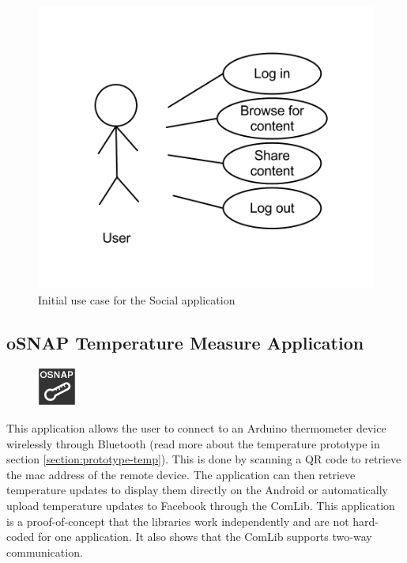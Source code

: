 \begin{figure}[H]
	\centering \includegraphics[scale=0.35]{img/design-socialappusecase1}
	\caption{Initial use case for the Social application}
	\label{fig:design-socialappusecase1}
\end{figure}

\subsection{oSNAP Temperature Measure Application}
\begin{figure}
	\centering \includegraphics[scale=1]{img/app-temp}
\end{figure}
This application allows the user to connect to an Arduino thermometer device wirelessly through Bluetooth (read more about the 
temperature prototype in section \ref{section:prototype-temp}). This is done by scanning a QR code to retrieve the mac address
 of the remote device. The application can then retrieve temperature updates to display them directly on the Android or automatically 
upload temperature updates to Facebook through the ComLib. This application is a proof-of-concept that the libraries work independently
 and are not hard-coded for one application. It also shows that the ComLib supports two-way communication.

